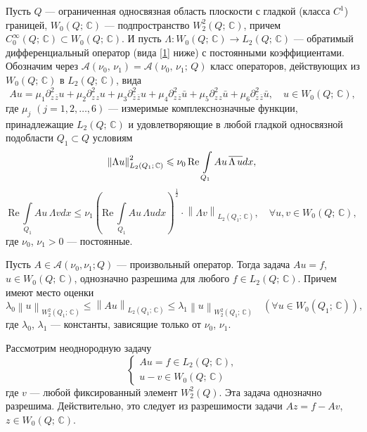 Пусть $Q$  --- ограниченная односвязная область плоскости с гладкой
(класса $C^1$) границей, $W_0(Q;\, \mathbb{C})$ --- подпространство $W_2^2(Q;\, \mathbb{C})$,
причем $C_0^\infty(Q;\, \mathbb{C})\subset W_0(Q;\, \mathbb{C})$.
И пусть $\Lambda: W_0(Q;\, \mathbb{C})\to L_2(Q;\, \mathbb{C})$ ---
обратимый дифференциальный оператор (вида \ref{1} ниже) с постоянными коэффициентами.
Обозначим через  $\mathcal{A}(\nu_0,\,\nu_1)=\mathcal{A}(\nu_0,\,\nu_1;\,Q)$
класс операторов, действующих из $W_0(Q;\, \mathbb{C})$ в $L_2(Q;\,\mathbb{C})$,  вида
 \begin{equation}\label{1}
     Au=\mu_1\partial_{z\,\bar{z}}^2 u+\mu_2\partial_{z\,z}^2 u+
  \mu_3\partial_{\bar{z}\,\bar{z}}^2 u +\mu_4\partial_{z\,\bar{z}}^2 \bar{u}+
  \mu_5\partial_{z\,z}^2 \bar{u}+\mu_6\partial_{\bar{z}\,\bar{z}}^2 \bar{u},\quad
  u\in W_0(Q;\,\mathbb{C}),
 \end{equation}
где $\mu_j$ $(j=1,2,\dots,6)$ --- измеримые комплекснозначные функции,
принадлежащие $L_2(Q;\,\mathbb{C})$ и удовлетворяющие в любой гладкой односвязной
подобласти $Q_1\subset Q$ условиям
 \begin{equation}\label{2}
      \left\|\Lambda u\right\|^2_{L_2(Q_1;\,\mathbb{C})}\leqslant \nu_0\,
      \text{Re}\, \int\limits_{Q_1}Au\, \overline{\Lambda\,u} dx,\\
 \end{equation}
\begin{equation}\label{3}
   \text{Re}\,\int\limits_{Q_1} Au\,\Lambda v dx\leqslant\nu_1 \left(\text{Re}\, \int\limits_{Q_1} Au\,
    \Lambda u dx\right)^{\frac12}\cdot \left\| \Lambda v\right\|_{L_2(Q_1;\,\mathbb{C})},\quad
\forall u,v\in W_0(Q;\,\mathbb{C}),
\end{equation}
где $\nu_0$, $\nu_1>0$ ---  постоянные.
\begin{theorem}  \label{teor1}
Пусть $A\in \mathcal{A}(\nu_0,\nu_1; Q)$ --- произвольный оператор. Тогда задача $Au=f$,
$u\in W_0(Q;\,\mathbb{C})$, однозначно разрешима для любого $f\in L_2(Q;\,\mathbb{C})$.
Причем имеют место оценки
$$
\lambda_0\left\| u\right\|_{W_2^2(Q_1;\,\mathbb{C})}\leqslant
 \left\| Au \right\|_{L_2(Q_1;\,\mathbb{C})} \leqslant
 \lambda_1 \left\| u\right\|_{W_2^2(Q_1;\,\mathbb{C})}
 \quad (\forall  u\in W_0(Q_1;\,\mathbb{C})) ,
$$
где $\lambda_0$, $\lambda_1$ --- константы, зависящие только от $\nu_0$, $\nu_1$.
\end{theorem}



Рассмотрим неоднородную задачу
$$
\left\{\begin{array}{l}
  Au=f\in L_2(Q;\,\mathbb{C}), \\[1mm]
u-v\in W_0(Q;\,\mathbb{C})
\end{array}\right.
    $$
где $v$ --- любой фиксированный элемент $W_2^2(Q)$.
Эта задача однозначно разрешима. Действительно, это
следует из разрешимости задачи $Az=f-Av$, $z\in W_0(Q;\,\mathbb{C})$.

